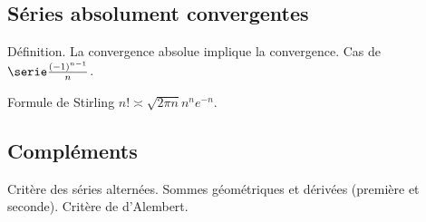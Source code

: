 \documentclass[a4paper,french,bookmarks]{article}
\begin{document}
\subsection*{Séries absolument convergentes}

\begin{enumerate}
    \ithand Définition. La convergence absolue implique la convergence. Cas de $\serie \frac{\left(-1\right)^{n-1}}{n}$.
    
    \ithand Formule de Stirling $n! \asymp \sqrt{2\pi n} n^n e^{-n}$. 
\end{enumerate}

\subsection*{Compléments}

\begin{enumerate}
    \ithand Critère des séries alternées. Sommes géométriques et dérivées (première et seconde). Critère de d'Alembert.
\end{enumerate}

\questionsdecours
\end{document}
